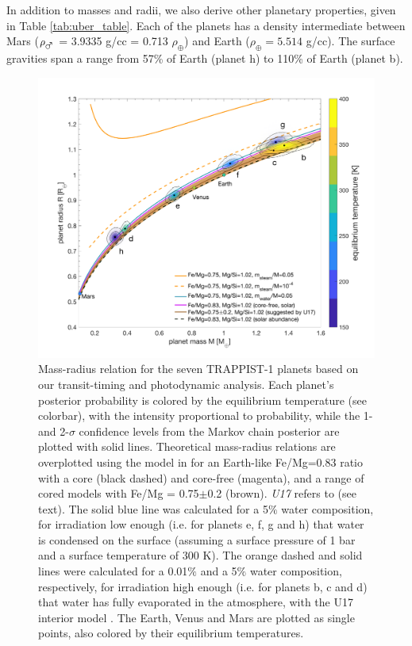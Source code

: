 \documentclass[twocolumn]{aastex63}
\begin{document}
In addition to masses and radii, we also derive other planetary properties,
given in Table \ref{tab:uber_table}.  Each of the planets has a density
intermediate between Mars ($\rho_{\mars}$ = 3.9335 g/cc = 0.713 $\rho_\oplus$) and 
Earth ($\rho_\oplus = 5.514$ g/cc).  The surface gravities span a range
from 57\% of Earth (planet h) to 110\% of Earth (planet b).  

\begin{figure}
    \centering
   \includegraphics[width=\hsize]{figures/Figure_MR_v8.png}
    \caption{Mass-radius relation for the seven TRAPPIST-1 planets based on 
    our transit-timing and photodynamic analysis.  
    Each planet's posterior probability is colored by the equilibrium temperature
    (see colorbar), with the intensity proportional to probability, while the 1- and 2-$\sigma$ 
    confidence levels from the Markov chain posterior are plotted with solid lines.  
    Theoretical mass-radius relations are overplotted using the model in \citet{Dorn2016} for an Earth-like Fe/Mg=0.83 ratio with a core (black dashed) and core-free (magenta), and a range of cored models with Fe/Mg = 0.75$\pm$0.2 (brown).  {\it U17} refers to \citet{Unterborn2018a} (see text).
     The solid blue line was calculated for a 5$\%$ water composition, for irradiation low enough (i.e. for planets e, f, g and h) that water is condensed on the surface  (assuming a surface pressure of 1 bar and a surface temperature of 300 K). The orange dashed and solid lines were calculated for a 0.01$\%$ and a 5$\%$ water composition, respectively, for irradiation high enough (i.e. for planets b, c and d) that water has fully evaporated in the atmosphere, with the U17 interior model \citep{Turbet2020}.
    The Earth, Venus and Mars are plotted as single points, also colored by their equilibrium temperatures.}
    \label{fig:mass_radius_relation}
\end{figure}
\end{document}
